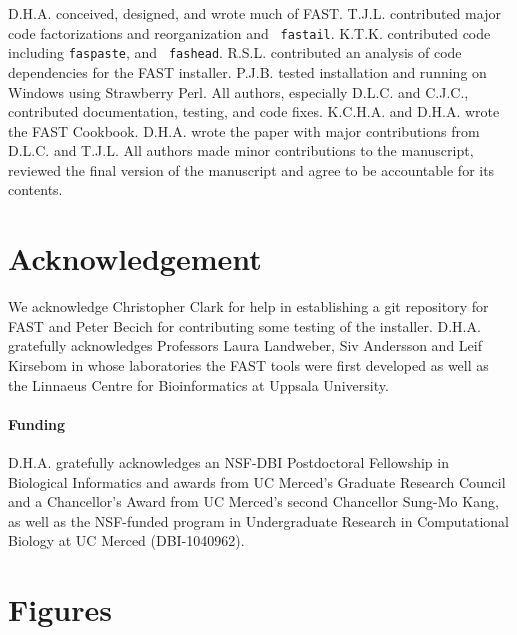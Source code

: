 \documentclass{frontiersSCNS} %
\begin{document}
D.H.A. conceived, designed, and wrote much of FAST. T.J.L. contributed
major code factorizations and reorganization and {\tt
  fastail}. K.T.K. contributed code including {\tt faspaste}, and {\tt
  fashead}. R.S.L. contributed an analysis of code dependencies for
the FAST installer. P.J.B. tested installation and running on Windows
using Strawberry Perl. All authors, especially D.L.C. and C.J.C.,
contributed documentation, testing, and code fixes. K.C.H.A. and
D.H.A. wrote the FAST Cookbook. D.H.A. wrote the paper with major
contributions from D.L.C. and T.J.L. All authors made minor
contributions to the manuscript, reviewed the final version of the
manuscript and agree to be accountable for its contents.

\section*{Acknowledgement}
We acknowledge Christopher Clark for help in establishing a git
repository for FAST and Peter Becich for contributing some testing of
the installer. D.H.A. gratefully acknowledges Professors Laura
Landweber, Siv Andersson and Leif Kirsebom in whose laboratories the
FAST tools were first developed as well as the Linnaeus Centre for
Bioinformatics at Uppsala University.

\paragraph{Funding\textcolon} D.H.A. gratefully acknowledges an
NSF-DBI Postdoctoral Fellowship in Biological Informatics and awards
from UC Merced's Graduate Research Council and a Chancellor's Award
from UC Merced's second Chancellor Sung-Mo Kang, as well as the
NSF-funded program in Undergraduate Research in Computational
Biology at UC Merced (DBI-1040962).



\section*{Figures}
\end{document}
